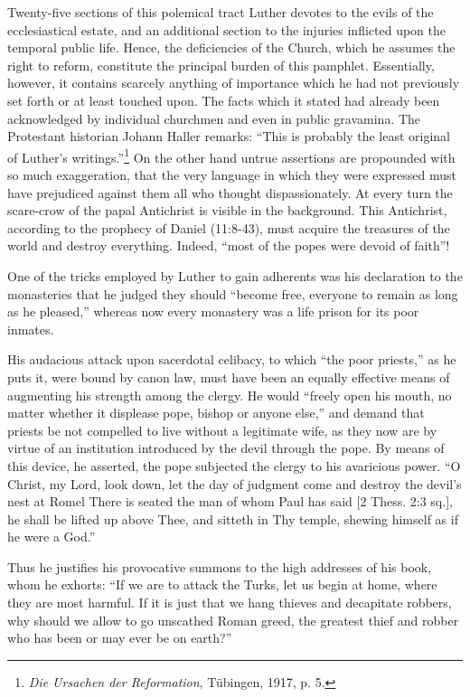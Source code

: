 Twenty-five sections of this polemical tract Luther devotes to
the evils of the ecclesiastical estate, and an additional section to the
injuries inflicted upon the temporal public life. Hence, the deficiencies
of the Church, which he assumes the right to reform, constitute the
principal burden of this pamphlet. Essentially, however, it contains
scarcely anything of importance which he had not previously set
forth or at least touched upon. The facts which it stated had already
been acknowledged by individual churchmen and even in public
gravamina. The Protestant historian Johann Haller remarks: “This
is probably the least original of Luther’s writings.”\footnote
{\textit{Die Ursachen der Reformation}, Tübingen, 1917, p. 5.}
On the other
hand untrue assertions are propounded with so much exaggeration,
that the very language in which they were expressed must have prejudiced
against them all who thought dispassionately. At every turn
the scare-crow of the papal Antichrist is visible in the background.
This Antichrist, according to the prophecy of Daniel (11:8-43),
must acquire the treasures of the world and destroy everything. Indeed,
“most of the popes were devoid of faith”!

One of the tricks employed by Luther to gain adherents was his declaration
to the monasteries that he judged they should “become free, everyone
to remain as long as he pleased,” whereas now every monastery was a life
prison for its poor inmates.

His audacious attack upon sacerdotal celibacy, to which “the poor
priests,” as he puts it, were bound by canon law, must have been an equally
effective means of augmenting his strength among the clergy. He would
“freely open his mouth, no matter whether it displease pope, bishop or anyone
else,” and demand that priests be not compelled to live without a legitimate
wife, as they now are by virtue of an institution introduced by the devil
through the pope. By means of this device, he asserted, the pope subjected
the clergy to his avaricious power. “O Christ, my Lord, look down, let the
day of judgment come and destroy the devil’s nest at Romel There is seated
the man of whom Paul has said [2 Thess. 2:3 sq.], he shall be lifted up
above Thee, and sitteth in Thy temple, shewing himself as if he were a
God.”

Thus he justifies his provocative summons to the high addresses of his
book, whom he exhorts: “If we are to attack the Turks, let us begin at
home, where they are most harmful. If it is just that we hang thieves and
decapitate robbers, why should we allow to go unscathed Roman greed,
the greatest thief and robber who has been or may ever be on earth?”

